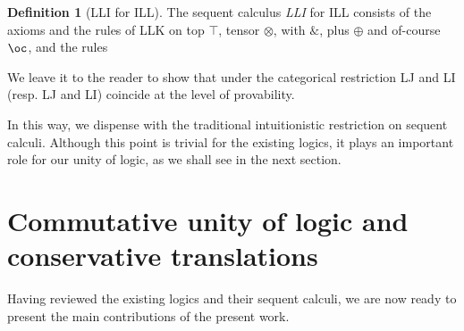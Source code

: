 \documentclass[a4paper]{article}
\theoremstyle{definition}
\newtheorem{definition}{Definition}[section]
\theoremstyle{theorem}
\theoremstyle{remark}
\begin{document}
\begin{definition}[\textsf{LLI} for ILL]
\label{DefLLI}
The sequent calculus \emph{\textsf{LLI}} for ILL consists of the axioms and the rules of \textsf{LLK} on top $\top$, tensor $\otimes$, with $\&$, plus $\oplus$ and of-course $\oc$, and the rules
\end{definition}

We leave it to the reader to show that under the categorical restriction \textsf{LJ} and \textsf{LI} (resp. \textsf{LJ} and \textsf{LI}) coincide at the level of provability.

In this way, we dispense with the traditional intuitionistic restriction on sequent calculi.
Although this point is trivial for the existing logics, it plays an important role for our unity of logic, as we shall see in the next section.
\fi








\section{Commutative unity of logic and conservative translations}
\label{CommutativeUnityOfLogic}
Having reviewed the existing logics and their sequent calculi, we are now ready to present the main contributions of the present work.
\end{document}
